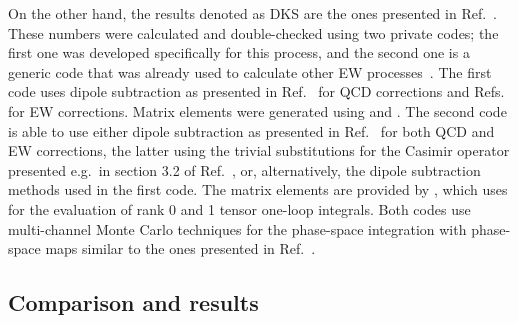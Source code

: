 On the other hand, the results denoted as DKS are the ones presented in Ref.~\cite{Dittmaier:2019twg}.
These numbers were calculated and double-checked using two private codes; the first one was developed specifically for this process, and the second one is a generic code that was already used to calculate other EW processes~\cite{Ballestrero:2018anz,Denner:2019tmn,Denner:2019zfp}.
The first code uses dipole subtraction as presented in Ref.~\cite{Catani:1996vz} for QCD corrections and Refs.~\cite{Dittmaier:1999mb,Dittmaier:2008md} for EW corrections.
Matrix elements were generated using \Madgraph \cite{Alwall:2014hca} and \Recola.
The second code is able to use either dipole subtraction as presented in Ref.~\cite{Catani:1996vz} for both QCD and EW corrections, the latter using the trivial substitutions for the Casimir operator presented e.g.\ in section 3.2 of Ref.~\cite{Kallweit:2014xda}, or, alternatively, the dipole subtraction methods used in the first code.
The matrix elements are provided by \OpenLoops \cite{Cascioli:2011va,Kallweit:2014xda,Buccioni:2019sur}, which uses \Collier \cite{Denner:2016kdg,Denner:2002ii,Denner:2005nn,Denner:2010tr} for the evaluation of rank 0 and 1 tensor one-loop integrals.
Both codes use multi-channel Monte Carlo techniques \cite{Hilgart:1992xu,Kleiss:1994qy} for the phase-space integration with phase-space maps similar to the ones presented in Ref.~\cite{Dittmaier:2002ap}.

\subsection{Comparison and results}
\label{sec:WWW:comparison}

